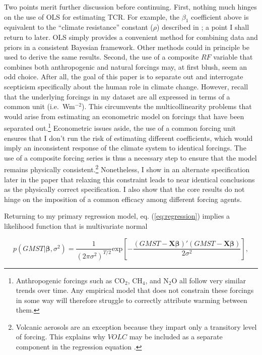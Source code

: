\documentclass[smallextended]{svjour3}       %
\begin{document}
Two points merit further discussion before continuing. First, nothing
much hinges on the use of OLS for estimating TCR. For example, the
\(\beta_1\) coefficient above is equivalent to the ``climate
resistance'' constant (\(\rho\)) described in
\cite{gregory2008transient}; a point I shall return to later. OLS simply
provides a convenient method for combining data and priors in a
consistent Bayesian framework. Other methods could in principle be used
to derive the same results. Second, the use of a composite \(RF\)
variable that combines both anthropogenic and natural forcings may, at
first blush, seem an odd choice. After all, the goal of this paper is to
separate out and interrogate scepticism specifically about the human
role in climate change. However, recall that the underlying forcings in
my dataset are all expressed in terms of a common unit
(i.e.~Wm\(^{-2}\)). This circumvents the multicollinearity problems that
would arise from estimating an econometric model on forcings that have
been separated out.\footnote{Anthropogenic forcings such as CO\(_2\),
  CH\(_4\), and N\(_2\)O all follow very similar trends over time. Any
  empirical model that does not constrain these forcings in some way
  will therefore struggle to correctly attribute warming between them.}
Econometric issues aside, the use of a common forcing unit ensures that
I don't run the risk of estimating different coefficients, which would
imply an inconsistent response of the climate system to identical
forcings. The use of a composite forcing series is thus a necessary step
to ensure that the model remains physically consistent.\footnote{Volcanic
  aerosols are an exception because they impart only a transitory level
  of forcing. This explains why \(VOLC\) may be included as a separate
  component in the regression equation \cite{estrada2013statistically}.}
Nonetheless, I show in an alternate specification later in the paper
that relaxing this constraint leads to near identical conclusions as the
physically correct specification. I also show that the core results do
not hinge on the imposition of a common efficacy among different forcing
agents.

Returning to my primary regression model, eq. (\ref{eq:regression})
implies a likelihood function that is multivariate normal

\begin{equation}
   p(GMST | \boldsymbol{\beta}, \sigma^2) =  \frac{1}{\left(2 \pi \sigma^2\right)^{T/2}} \text{exp}\left[ - \frac{(GMST - \mathbf{X}\boldsymbol{\beta})'(GMST - \mathbf{X}\boldsymbol{\beta})}{2 \sigma^2} \right], \label{eq:likelihood}
\end{equation}
\end{document}
